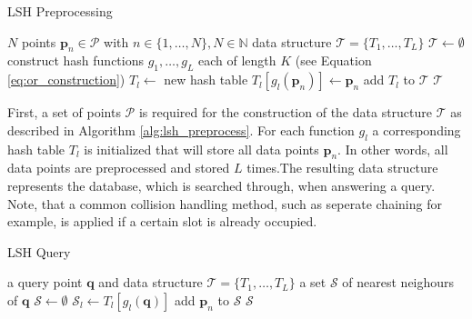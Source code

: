 \documentclass[../../../main.tex]{subfiles}
\begin{document}
\begin{algorithm}
    \caption{LSH Preprocessing}
    \label{alg:lsh_preprocess}
    \begin{algorithmic}[1]
        \REQUIRE $N$ points $\bm{p}_n \in \mathcal{P}$ with $n \in \{1, \dots, N\}, N \in \mathbb{N}$
        \ENSURE data structure $\mathcal{T} = \{T_1, \dots, T_L\}$
        \STATE $\mathcal{T} \leftarrow \emptyset$
        \STATE construct hash functions $g_1, \dots, g_L$ each of length $K$ (see Equation \ref{eq:or_construction})
            \STATE $T_l \leftarrow$ new hash table
                \STATE $T_l[g_l(\bm{p}_n)] \leftarrow \bm{p}_n$
            \ENDFOR
            \STATE add $T_l$ to $\mathcal{T}$
        \ENDFOR
        \RETURN $\mathcal{T}$
    \end{algorithmic}
 \end{algorithm}

 First, a set of points $\mathcal{P}$ is required for the construction of the data structure $\mathcal{T}$ as described in Algorithm \ref{alg:lsh_preprocess}. For each function $g_l$ a corresponding hash table $T_l$ is initialized that will store all data points $\bm{p}_n$.  In other words, all data points are preprocessed and stored $L$ times.The resulting data structure represents the database, which is searched through, when answering a query. Note, that a common collision handling method, such as seperate chaining for example, is applied if a certain slot is already occupied.

 \begin{algorithm}
    \caption{LSH Query}
    \label{alg:lsh_query}
    \begin{algorithmic}[1]
        \REQUIRE a query point $\bm{q}$ and data structure $\mathcal{T} = \{T_1, \dots, T_L\}$
        \ENSURE a set $\mathcal{S}$ of nearest neighours of $\bm{q}$
        \STATE $\mathcal{S} \leftarrow \emptyset$
            \STATE $\mathcal{S}_l \leftarrow T_l[g_l(\bm{q})]$
                        \STATE add $\bm{p}_n$ to $\mathcal{S}$
                    \ENDIF
                \ENDFOR
            \ENDIF
        \ENDFOR
        \RETURN $\mathcal{S}$
    \end{algorithmic}
 \end{algorithm}
\end{document}
